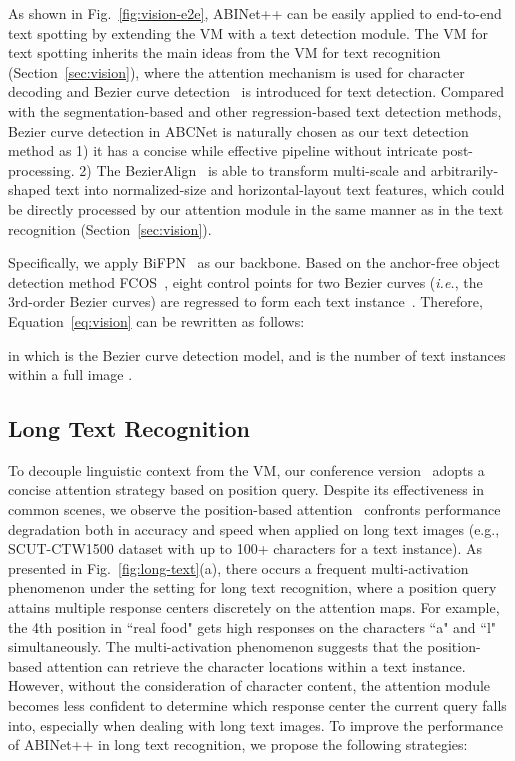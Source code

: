 \documentclass[10pt,journal,compsoc]{IEEEtran}
\def\ie{{\it i.e.}\xspace}
\begin{document}
As shown in Fig.~\ref{fig:vision-e2e}, ABINet++ can be easily applied to end-to-end text spotting by extending the VM with a text detection module. The VM for text spotting inherits the main ideas from the VM for text recognition (Section~\ref{sec:vision}), where the attention mechanism is used for character decoding and Bezier curve detection~\cite{liu2020abcnet,liu2020abcnetv2} is introduced for text detection. Compared with the segmentation-based and other regression-based text detection methods, Bezier curve detection in ABCNet is naturally chosen as our text detection method as 1) it has a concise while effective pipeline without intricate post-processing. 2) The BezierAlign~\cite{liu2020abcnet} is able to transform multi-scale and arbitrarily-shaped text into normalized-size and horizontal-layout text features, which could be directly processed by our attention module in the same manner as in the text recognition (Section~\ref{sec:vision}).

Specifically, we apply BiFPN~\cite{tan2020efficientdet, liu2020abcnetv2} as our backbone. Based on the anchor-free object detection method FCOS~\cite{tian2019fcos}, eight control points for two Bezier curves (\ie, the 3rd-order Bezier curves) are regressed to form each text instance~\cite{liu2020abcnet}. Therefore, Equation~\ref{eq:vision} can be rewritten as follows:

in which  is the Bezier curve detection model, and  is the number of text instances within a full image .


\subsection{Long Text Recognition}

To decouple linguistic context from the VM, our conference version~\cite{fang2021read} adopts a concise attention strategy based on position query. Despite its effectiveness in common scenes, we observe the position-based attention~\cite{fang2021read,yu2020towards,lyu20192d} confronts performance degradation both in accuracy and speed when applied on long text images (e.g., SCUT-CTW1500 dataset with up to 100+ characters for a text instance). As presented in Fig.~\ref{fig:long-text}(a), there occurs a frequent multi-activation phenomenon under the setting for long text recognition, where a position query attains multiple response centers discretely on the attention maps. For example, the 4th position in ``real food" gets high responses on the characters ``a" and ``l" simultaneously. The multi-activation phenomenon suggests that the position-based attention can retrieve the character locations within a text instance. However, without the consideration of character content, the attention module becomes less confident to determine which response center the current query falls into, especially when dealing with long text images. To improve the performance of ABINet++ in long text recognition, we propose the following strategies:
\end{document}
